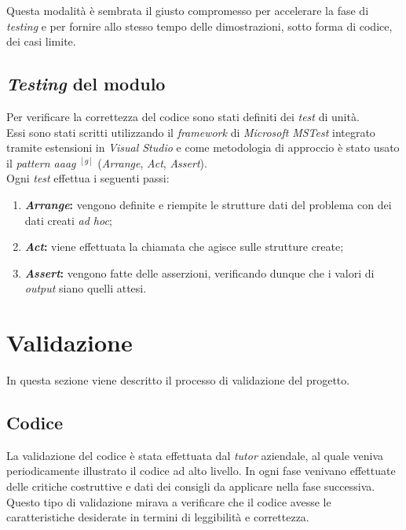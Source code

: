 \noindent Questa modalità è sembrata il giusto compromesso per accelerare la
fase di \textit{testing} e per fornire allo stesso tempo delle dimostrazioni, sotto forma di
codice, dei casi limite.

\subsection{\textit{Testing} del modulo}
\noindent Per verificare la correttezza del codice sono stati definiti dei \textit{test} di unità.\\
Essi sono stati scritti utilizzando il \textit{framework} di \textit{Microsoft} \textit{MSTest} \cite{siteM:mstest} integrato tramite estensioni
in \textit{Visual Studio} e come metodologia di approccio è stato usato il \textit{pattern \gls{aaag}} $^{[g]}$ (\textit{Arrange}, \textit{Act}, \textit{Assert}).\\
Ogni \textit{test} effettua i seguenti passi:
\begin{enumerate}
    \item \textbf{\textit{Arrange}:} vengono definite e riempite le strutture dati del problema con dei
    dati creati \textit{ad hoc};
    \item \textbf{\textit{Act}:} viene effettuata la chiamata che agisce sulle strutture create;
    \item \textbf{\textit{Assert}:} vengono fatte delle asserzioni, verificando dunque che i valori di \textit{output} 
    siano quelli attesi.
\end{enumerate}





\section{Validazione}
\noindent In questa sezione viene descritto il processo di validazione del progetto.
\subsection{Codice}
\noindent La validazione del codice è stata effettuata dal \textit{\textit{tutor}} aziendale,
al quale veniva periodicamente illustrato il codice ad alto livello.
In ogni fase venivano effettuate delle critiche costruttive e dati dei consigli
da applicare nella fase successiva. Questo tipo di validazione mirava a verificare che il codice avesse le caratteristiche desiderate in termini di leggibilità e correttezza.
